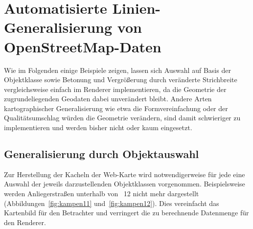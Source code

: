 \documentclass[../main/thesis.tex]{subfiles}
\begin{document}




\section{Automatisierte Linien-Generalisierung von OpenStreetMap-Daten}

Wie im Folgenden einige Beispiele zeigen, lassen sich Auswahl auf Basis der Objektklasse sowie Betonung und Vergrößerung durch veränderte Strichbreite vergleichsweise einfach im Renderer implementieren, da die Geometrie der zugrundeliegenden Geodaten dabei unverändert bleibt.
Andere Arten kartographischer Generalisierung wie etwa die Formvereinfachung oder der Qualitätsumschlag würden die Geometrie verändern, sind damit schwieriger zu implementieren und werden bisher nicht oder kaum eingesetzt.




\subsection{Generalisierung durch Objektauswahl}

Zur Herstellung der Kacheln der Web-Karte wird notwendigerweise für jede  eine Auswahl der jeweils darzustellenden Objektklassen vorgenommen.
Beispielsweise werden Anliegerstraßen  unterhalb von ~12 nicht mehr dargestellt (Abbildungen~\ref{fig:kampen11} und~\ref{fig:kampen12}).
Dies vereinfacht das Kartenbild für den Betrachter und verringert die zu berechnende Datenmenge für den Renderer.
\end{document}
